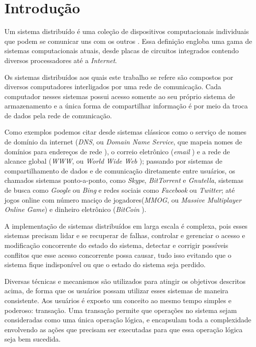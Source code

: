 \documentclass[11pt,twoside,a4paper]{book}
\begin{document}
\listoffigures
\listoftables
\listofalgorithms
\lstlistoflistings
\mainmatter

\fancyhead[RE,LO]{\thesection}

\singlespacing              %

\chapter{Introdução}
\label{chap:introducao}
Um sistema distribuído é uma coleção de dispositivos computacionais individuais que podem se comunicar uns com os outros \cite{tanenbaum, distributed_computing}. Essa definição engloba uma gama de sistemas computacionais atuais, desde placas de circuitos integrados contendo diversos processadores até a \emph{Internet}. 

Os sistemas distribuídos aos quais este trabalho se refere são compostos por diversos computadores interligados por uma rede de comunicação. Cada computador nesses sistemas possui acesso somente ao seu próprio sistema de armazenamento e a única forma de compartilhar informação é por meio da troca de dados pela rede de comunicação.

Como exemplos podemos citar desde sistemas clássicos como o serviço de nomes de domínio da internet (\emph{DNS}, ou \emph{Domain Name Service}, que mapeia nomes de domínios para endereços de rede \cite{dns}), o correio eletrônico (\emph{email} \cite{email}) e a rede de alcance global (\emph{WWW}, ou \emph{World Wide Web} \cite{www}); passando por sistemas de compartilhamento de dados e de comunicação diretamente entre usuários, os chamados sistemas ponto-a-ponto, como \emph{Skype}, \emph{BitTorrent} e \emph{Gnutella}, sistemas de busca como \emph{Google} ou \emph{Bing} e redes sociais como \emph{Facebook} ou \emph{Twitter}; até jogos online com número maciço de jogadores(\emph{MMOG}, ou \emph{Massive Multiplayer Online Game}) e dinheiro eletrônico (\emph{BitCoin} \cite{bitcoin}).

A implementação de sistemas distribuídos em larga escala é complexa, pois esses sistemas precisam lidar e se recuperar de falhas, controlar e gerenciar o acesso e modificação concorrente do estado do sistema, detectar e corrigir possíveis conflitos que esse acesso concorrente possa causar, tudo isso evitando que o sistema fique indisponível ou que o estado do sistema seja perdido.

Diversas técnicas e mecanismos são utilizados para atingir os objetivos descritos acima, de forma que os usuários possam utilizar esses sistemas de maneira consistente. Aos usuários é exposto um conceito ao mesmo tempo simples e poderoso: transação. Uma transação permite que operações no sistema sejam consideradas como uma única operação lógica, e encapsulam toda a complexidade envolvendo as ações que precisam ser executadas para que essa operação lógica seja bem sucedida.   
\end{document}

